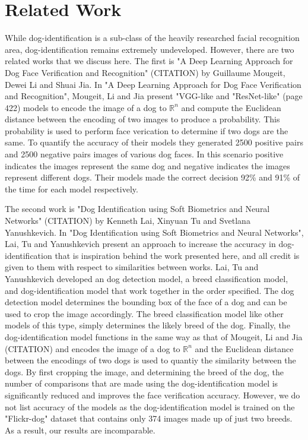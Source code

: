\documentclass{article}
\begin{document}
\section{Related Work}
While dog-identification is a sub-class of the heavily researched facial recognition area, dog-identification remains extremely undeveloped.  However, there are two related works that we discuss here.  The first is "A Deep Learning Approach for Dog Face Verification and Recognition" (CITATION)  by  Guillaume Mougeit, Dewei Li and Shuai Jia.  In "A Deep Learning Approach for Dog Face Verification and Recognition", Mougeit, Li and Jia present "VGG-like and "ResNet-like" (page 422) models to encode the image of a dog to $\mathbb{R}^n$ and compute the Euclidean distance between the encoding of two images to produce a probability.  This probability is used to perform face verication to determine if two dogs are the same.  To quantify the accuracy of their models they generated 2500 positive pairs and 2500 negative pairs images of various dog faces.  In this scenario positive indicates the images represent the same dog and negative indicates the images represent different dogs.  Their models made the correct decision 92\% and 91\% of the time for each model respectively.

The second work is "Dog Identification using Soft Biometrics and Neural Networks" (CITATION) by Kenneth Lai, Xinyuan Tu and Svetlana Yanushkevich.  In "Dog Identification using Soft Biometrics and Neural Networks", Lai, Tu and Yanushkevich present an approach to increase the accuracy in dog-identification that is inspiration behind the work presented here, and all credit is given to them with respect to similarities between works.  Lai, Tu and Yanushkevich developed an dog detection model, a breed classification model, and dog-identification model that work together in the order specified.   The dog detection model determines the bounding box of the face of a dog and can be used to crop the image accordingly.  The breed classification model like other models of this type, simply determines the likely breed of the dog.  Finally, the dog-identification model functions in the same way as that of  Mougeit, Li and Jia (CITATION) and encodes the image of a dog to $\mathbb{R}^n$ and the Euclidean distance between the encodings of two dogs is used to quantiy the similarity between the dogs.  By first cropping the image, and determining the breed of the dog, the number of comparisons that are made using the dog-identification model is significantly reduced and improves the face verification accuracy.  However, we do not list accuracy of the models as the dog-identification model is trained on the "Flickr-dog" dataset that contains only 374 images made up of just two breeds.  As a result, our results are incomparable.
\end{document}
